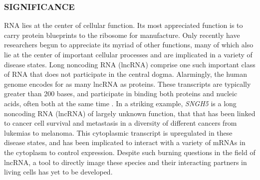 

\subsubsection*{SIGNIFICANCE}
RNA lies at the center of cellular function. Its most appreciated function is to carry protein blueprints to the ribosome for manufacture.
Only recently have researchers begun to appreciate its myriad of other functions, many of which also lie at the center of important cellular processes and are implicated in a variety of disease states\cite{CechNoncodingRNARevolution2014,DellaRagioneNoncodingRNAschromatin2014,AnastasiadouNoncodingRNAnetworks2018}.
Long noncoding RNA (lncRNA) comprise one such important class of RNA that does not participate in the central dogma\cite{RinnGenomeRegulationLong2012}. Alarmingly, the human genome encodes for as many lncRNA as proteins\cite{Rinntranscriptionalactivityhuman2003}.
These transcripts are typically greater than 200 bases, and participate in binding both proteins and nucleic acids, often both at the same time \comment{[cite]}.
In a striking example, \textit{SNGH5} is a long noncoding RNA (lncRNA) of largely unknown function, that that has been linked to cancer cell survival and metastasis in a diversity of different cancers from lukemias to melanoma\cite{DamasSNHG5promotescolorectal2016,ZhaoLongnoncodingRNA2016,HeLncRNASNHG5regulates2017,YanSNHG5promotesproliferation2018,MalncRNASNHG5associated2018,ShenLncRNASNHG5miR26a2018,ZhengLongnoncodingRNA}. This  cytoplasmic transcript is upregulated in these disease states, and has been implicated to interact with a variety of mRNAs in the cytoplasm to control expression. Despite such burning questions in the field of lncRNA, a tool to directly image these species and their interacting partners in living cells has yet to be developed.

